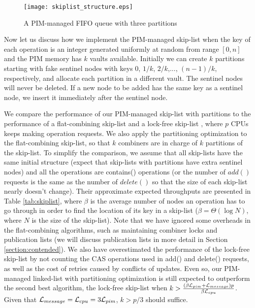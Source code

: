 \begin{figure}[ht!]
\centering
\texttt{[image: skiplist\_structure.eps]}
\caption{A PIM-managed FIFO queue with three partitions}
\label{figure:skiplist_structure}
\end{figure}

Now let us discuss how we implement the PIM-managed skip-list
when the key of each operation is an integer generated uniformly at random
from range $[0, n]$ and the PIM memory has $k$ vaults available.
Initially we can create $k$ partitions starting with fake sentinel nodes
with keys $0$, $1/k$, $2/k$,..., $(n-1)/k$, respectively, 
and allocate each partition in a different vault. 
The sentinel nodes will never be deleted.
If a new node to be added has the same key as a sentinel node,
we insert it immediately after the sentinel node.

We compare the performance of our PIM-managed skip-list with partitions 
to the performance of a flat-combining skip-list \cite{Hendler10}
and a lock-free skip-list \cite{Herlihy08}, 
where $p$ CPUs keeps making operation requests.
We also apply the partitioning optimization to the flat-combining skip-list, 
so that $k$ combiners are in charge of $k$ partitions of the skip-list. 
To simplify the comparison, we assume that all skip-lists have the same
initial structure (expect that skip-lists with partitions have extra sentinel nodes)
and all the operations are contains() operations
(or the number of $add()$ requests is the same as the number of $delete()$ 
so that the size of each skip-list nearly doesn't change).
Their approximate expected throughputs are presented in Table \ref{tab:skiplist}, 
where $\beta$ is the average number of nodes an operation has to go through
in order to find the location of its key in a skip-list
($\beta = \Theta(\log N)$, where $N$ is the size of the skip-list).
Note that we have ignored some overheads in the flat-combining
algorithms, such as maintaining combiner locks and publication lists
(we will discuss publication lists in more detail in Section \ref{section:contended}).
We also have overestimated the performance of the lock-free skip-list by not counting the
CAS operations used in add() and delete() requests, as well as the cost of retries
caused by conflicts of updates.
Even so, our PIM-managed linked-list with partitioning optimization is
still expected to outperform the second best algorithm, the lock-free skip-list 
when $k > {(\beta\mathcal{L}_{pim} + \mathcal{L}_{message})p \over \beta\mathcal{L}_{cpu}}$.
Given that $\mathcal{L}_{message} = \mathcal{L}_{cpu} = 3\mathcal{L}_{pim}$, $k > p/3$ should suffice.

